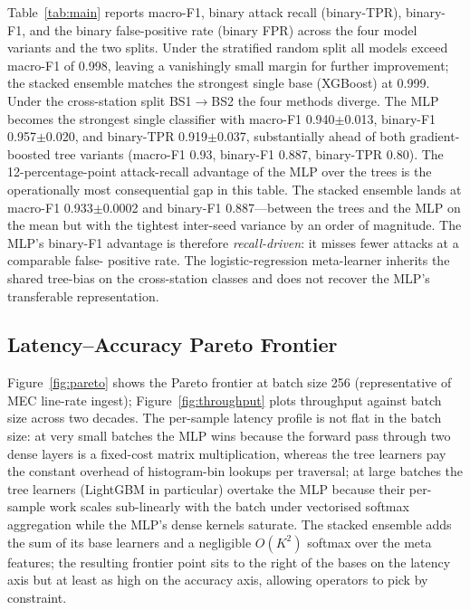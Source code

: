 \documentclass[conference]{IEEEtran}
\begin{document}
Table~\ref{tab:main} reports macro-F1, binary attack recall
(binary-TPR), binary-F1, and the binary false-positive rate (binary
FPR) across the four model variants and the two splits. Under the
stratified random split all models exceed macro-F1 of 0.998, leaving a
vanishingly small margin for further improvement; the stacked ensemble
matches the strongest single base (XGBoost) at 0.999. Under the
cross-station split BS1$\rightarrow$BS2 the four methods diverge. The
MLP becomes the strongest single classifier with macro-F1
0.940$\pm$0.013, binary-F1 0.957$\pm$0.020, and binary-TPR
0.919$\pm$0.037, substantially ahead of both gradient-boosted tree
variants (macro-F1 0.93, binary-F1 0.887, binary-TPR 0.80). The
12-percentage-point attack-recall advantage of the MLP over the trees
is the operationally most consequential gap in this table. The stacked ensemble lands
at macro-F1 0.933$\pm$0.0002 and binary-F1 0.887---between the trees
and the MLP on the mean but with the tightest inter-seed variance by
an order of magnitude. The MLP's binary-F1 advantage is therefore
\emph{recall-driven}: it misses fewer attacks at a comparable false-
positive rate. The logistic-regression meta-learner inherits the
shared tree-bias on the cross-station classes and does not recover the
MLP's transferable representation.



\subsection{Latency--Accuracy Pareto Frontier}

Figure~\ref{fig:pareto} shows the Pareto frontier at batch size 256
(representative of MEC line-rate ingest); Figure~\ref{fig:throughput}
plots throughput against batch size across two decades. The per-sample
latency profile is not flat in the batch size: at very small batches
the MLP wins because the forward pass through two dense layers is a
fixed-cost matrix multiplication, whereas the tree learners pay the
constant overhead of histogram-bin lookups per traversal; at large
batches the tree learners (LightGBM in particular) overtake the MLP
because their per-sample work scales sub-linearly with the batch under
vectorised softmax aggregation while the MLP's dense kernels saturate.
The stacked ensemble adds the sum of its base learners and a negligible
$O(K^2)$ softmax over the meta features; the resulting frontier point
sits to the right of the bases on the latency axis but at least as high
on the accuracy axis, allowing operators to pick by constraint.
\end{document}
